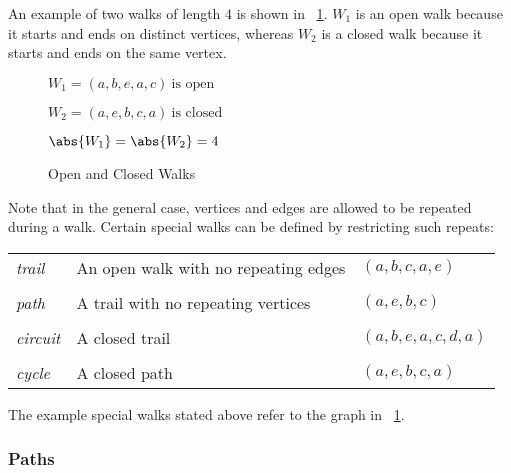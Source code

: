 An example of two walks of length \(4\) is shown in \figurename~\ref{fig:walks}.  \(W_1\) is an open walk because
it starts and ends on distinct vertices, whereas \(W_2\) is a closed walk because it starts and ends on the same
vertex.

\begin{figure}[H]
  \label{fig:walks}
  \begin{minipage}{3in}
    \begin{center}
    \end{center}
  \end{minipage}
  \begin{minipage}{3in}
    \(W_1=(a,b,e,a,c)\ \text{is open}\)

    \(W_2=(a,e,b,c,a)\ \text{is closed}\)

    \bigskip

    \(\abs{W_1}=\abs{W_2}=4\)
  \end{minipage}
  \caption{Open and Closed Walks}
\end{figure}

Note that in the general case, vertices and edges are allowed to be repeated during a walk.  Certain special walks
can be defined by restricting such repeats:

\begin{center}
  \begin{tabular}{lll}
    \emph{trail} & An open walk with no repeating edges & \((a,b,c,a,e)\) \\
    \\
    \emph{path} & A trail with no repeating vertices & \((a,e,b,c)\) \\
    \\
    \emph{circuit} & A closed trail & \((a,b,e,a,c,d,a)\) \\
    \\
    \emph{cycle} & A closed path & \((a,e,b,c,a)\)
  \end{tabular}
\end{center}

The example special walks stated above refer to the graph in \figurename~\ref{fig:walks}.

\subsubsection{Paths}\label{sec:sub:sub:walkpath}

